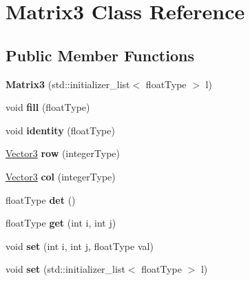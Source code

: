 \hypertarget{classMatrix3}{\section{Matrix3 Class Reference}
\label{classMatrix3}
}
\subsection*{Public Member Functions}
\begin{DoxyCompactItemize}
\item 
\hypertarget{classMatrix3_aad88e727b325076f32acfd7c66d94f3a}{{\bfseries Matrix3} (std\-::initializer\-\_\-list$<$ float\-Type $>$ l)}\label{classMatrix3_aad88e727b325076f32acfd7c66d94f3a}

\item 
\hypertarget{classMatrix3_a0d487774f15763f6af621c2023dc1dee}{void {\bfseries fill} (float\-Type)}\label{classMatrix3_a0d487774f15763f6af621c2023dc1dee}

\item 
\hypertarget{classMatrix3_aa4d43d5613248c9428638aaa2c66ffc6}{void {\bfseries identity} (float\-Type)}\label{classMatrix3_aa4d43d5613248c9428638aaa2c66ffc6}

\item 
\hypertarget{classMatrix3_a279983b451dd64cd784369257d0c4d1e}{\hyperlink{classVector3}{Vector3} {\bfseries row} (integer\-Type)}\label{classMatrix3_a279983b451dd64cd784369257d0c4d1e}

\item 
\hypertarget{classMatrix3_a31ff1165210e1e8976221c5f8112fc0c}{\hyperlink{classVector3}{Vector3} {\bfseries col} (integer\-Type)}\label{classMatrix3_a31ff1165210e1e8976221c5f8112fc0c}

\item 
\hypertarget{classMatrix3_acdabe5095c6b257103523fc5667f2c50}{float\-Type {\bfseries det} ()}\label{classMatrix3_acdabe5095c6b257103523fc5667f2c50}

\item 
\hypertarget{classMatrix3_af7a8ef49e171e7515ec8eef579a89f78}{float\-Type {\bfseries get} (int i, int j)}\label{classMatrix3_af7a8ef49e171e7515ec8eef579a89f78}

\item 
\hypertarget{classMatrix3_ad0f0c1bf0a6aa3486db63e88c466df5c}{void {\bfseries set} (int i, int j, float\-Type val)}\label{classMatrix3_ad0f0c1bf0a6aa3486db63e88c466df5c}

\item 
\hypertarget{classMatrix3_a0bc80c5e15212651f50f91a7b064ae64}{void {\bfseries set} (std\-::initializer\-\_\-list$<$ float\-Type $>$ l)}\label{classMatrix3_a0bc80c5e15212651f50f91a7b064ae64}


\end{DoxyCompactItemize}

